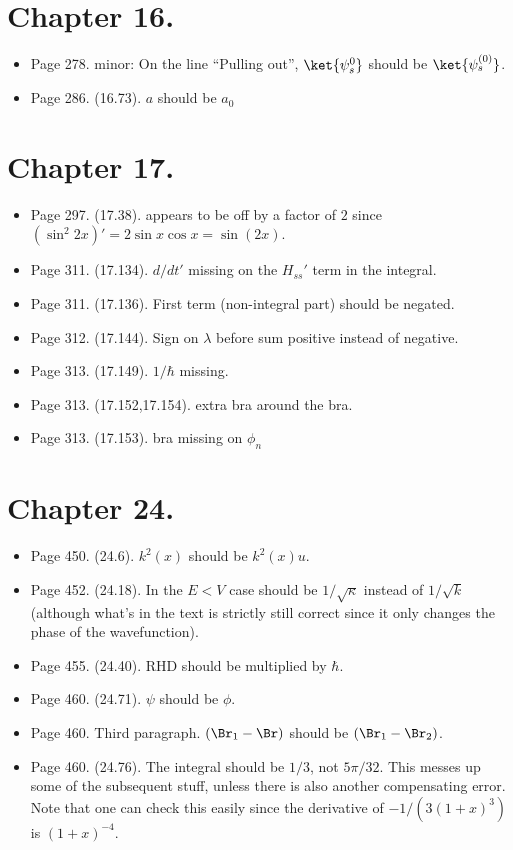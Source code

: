 \section{Chapter 16.}
\begin{itemize}
\item Page 278.  minor: On the line ``Pulling out'', $\ket{\psi_s^0}$ should be $\ket{\psi_s^{(0)}}$.
\item Page 286.  (16.73).  $a$ should be $a_0$
\end{itemize}

\section{Chapter 17.}
\begin{itemize}
\item Page 297.  (17.38).   appears to be off by a factor of $2$ since $(\sin^2 2x)' = 2 \sin x \cos x = \sin(2 x)$.
\item Page 311.  (17.134).  $d/dt'$ missing on the $H_{ss}'$ term in the integral.
\item Page 311.  (17.136).  First term (non-integral part) should be negated.
\item Page 312.  (17.144).  Sign on $\lambda$ before sum positive instead of negative.
\item Page 313.  (17.149).  $1/\hbar$ missing.
\item Page 313.  (17.152,17.154).  extra bra around the bra.
\item Page 313.  (17.153).  bra missing on $\phi_n$
\end{itemize}

\section{Chapter 24.}
\begin{itemize}
\item Page 450.  (24.6).  $k^2(x)$ should be $k^2(x) u$.
\item Page 452.  (24.18).  In the $E < V$ case should be $1/\sqrt{\kappa}$ instead of $1/\sqrt{k}$ (although what's in the text is strictly still correct since it only changes the phase of the wavefunction).
\item Page 455.  (24.40).  RHD should be multiplied by $\hbar$.
\item Page 460.  (24.71).  $\psi$ should be $\phi$.
\item Page 460.  Third paragraph.  $(\Br_1 - \Br)$ should be $(\Br_1 - \Br_2)$.
\item Page 460.  (24.76).  The integral should be $1/3$, not $5 \pi/32$.  This messes up some of the subsequent stuff, unless there is also another compensating error.  Note that one can check this easily since the derivative of $-1/(3 (1+x)^3)$ is $(1 + x)^{-4}$.
\end{itemize}

